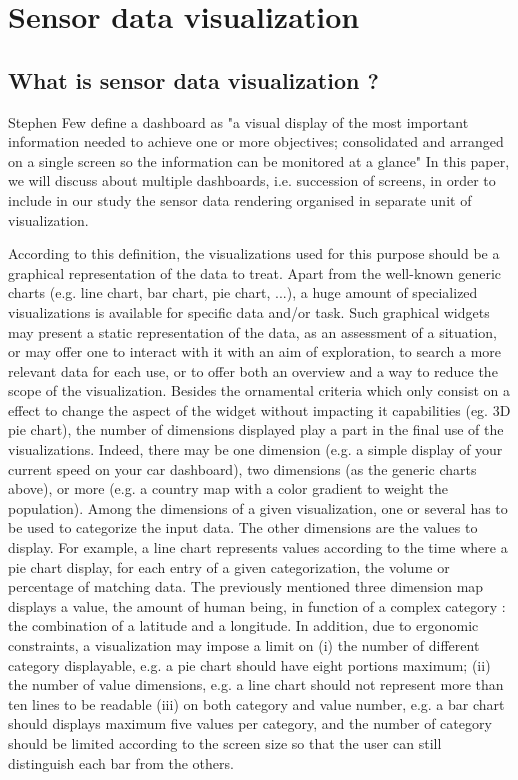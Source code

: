 \documentclass{acm_proc_article-sp}
\begin{document}
\section{Sensor data visualization}


\subsection{What is sensor data visualization ?}

Stephen Few define a dashboard as "a visual display of the most important
information needed to achieve one or more objectives; consolidated and arranged
on a single screen so the information can be monitored at a glance"\cite{few:dashboard}
In this paper, we will discuss about multiple dashboards, i.e. succession of screens,
in order to include in our study the sensor data rendering organised in separate unit
of visualization.

According to this definition, the visualizations used for this purpose should
be a graphical representation of the data to treat. Apart from the well-known
generic charts (e.g. line chart, bar chart, pie chart, ...), a huge amount
of specialized visualizations is available for specific data and/or task.
Such graphical widgets may present a static representation of the data, as an
assessment of a situation, or may offer one to interact with it with an aim of
exploration, to search a more relevant data for each use, or to offer both an
overview and a way to reduce the scope of the visualization.
Besides the ornamental criteria which only consist on a effect to change the
aspect of the widget without impacting it capabilities (eg. 3D pie chart), the
number of dimensions displayed play a part in the final use of the visualizations.
Indeed, there may be one dimension (e.g. a simple display of your current speed
on your car dashboard), two dimensions (as the generic charts above), or more
(e.g. a country map with a color gradient to weight the population). 
Among the dimensions of a given visualization, one or several has to be used to
categorize the input data. The other dimensions are the values to display.
For example, a line chart represents values according to the time where
a pie chart display, for each entry of a given categorization, the volume
or percentage of matching data. The previously mentioned three dimension map
displays a value, the amount of human being, in function of a complex category :
the combination of a latitude and a longitude.
In addition, due to ergonomic constraints, a visualization may impose a limit on
(i) the number of different category displayable, e.g. a pie chart should
have eight portions maximum;
(ii) the number of value dimensions, e.g. a line chart should not represent more
than ten lines to be readable
(iii) on both category and value number, e.g. a bar chart should displays maximum
five values per category, and the number of category should be limited according
to the screen size so that the user can still distinguish each bar from the others.
\end{document}
